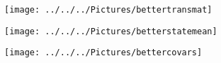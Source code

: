 \documentclass[english]{article}
\numberwithin{equation}{section}
\begin{document}
	\begin{figure}
		\centering
		\texttt{[image: ../../../Pictures/bettertransmat]}
		\caption[State transition matrix]{}
		\label{fig:transmat}
	\end{figure}
	
		\begin{figure}
		\centering
		\texttt{[image: ../../../Pictures/betterstatemean]}
		\caption[Emission matrix]{}
		\label{fig:emissionmeans}
	\end{figure}

	\begin{figure}
	\centering
	\texttt{[image: ../../../Pictures/bettercovars]}
	\caption[Emission matrix covariances]{}
	\label{fig:emissioncovars}
	\end{figure}
	
%	
%	
%	
%	
%	
%	
%	
\end{document}
